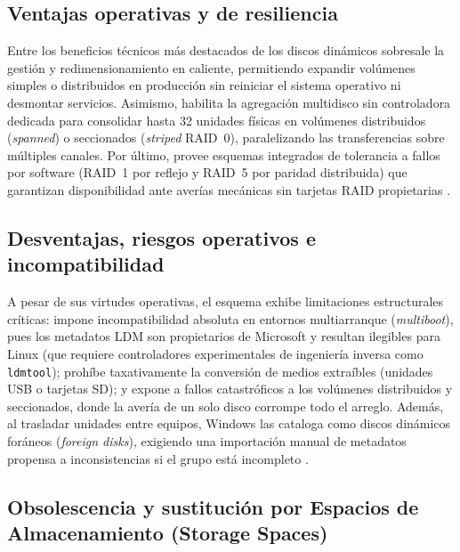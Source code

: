 \documentclass[12pt]{article}
\begin{document}
\subsection{Ventajas operativas y de resiliencia}
\label{subsec:ventajasDinamicos}

Entre los beneficios técnicos más destacados de los discos dinámicos sobresale la gestión y redimensionamiento en caliente, permitiendo expandir volúmenes simples o distribuidos en producción sin reiniciar el sistema operativo ni desmontar servicios. Asimismo, habilita la agregación multidisco sin controladora dedicada para consolidar hasta 32 unidades físicas en volúmenes distribuidos (\textit{spanned}) o seccionados (\textit{striped} RAID~0), paralelizando las transferencias sobre múltiples canales. Por último, provee esquemas integrados de tolerancia a fallos por software (RAID~1 por reflejo y RAID~5 por paridad distribuida) que garantizan disponibilidad ante averías mecánicas sin tarjetas RAID propietarias \parencite[\S 12.7, pp.\ 426--428]{silberschatz2006fundamentos}.

\subsection{Desventajas, riesgos operativos e incompatibilidad}
\label{subsec:desventajasDinamicos}

A pesar de sus virtudes operativas, el esquema exhibe limitaciones estructurales críticas: impone incompatibilidad absoluta en entornos multiarranque (\textit{multiboot}), pues los metadatos LDM son propietarios de Microsoft y resultan ilegibles para Linux (que requiere controladores experimentales de ingeniería inversa como \texttt{ldmtool}); prohíbe taxativamente la conversión de medios extraíbles (unidades USB o tarjetas SD); y expone a fallos catastróficos a los volúmenes distribuidos y seccionados, donde la avería de un solo disco corrompe todo el arreglo. Además, al trasladar unidades entre equipos, Windows las cataloga como discos dinámicos foráneos (\textit{foreign disks}), exigiendo una importación manual de metadatos propensa a inconsistencias si el grupo está incompleto \parencite{microsoft2024basicdynamic}.

\subsection{Obsolescencia y sustitución por Espacios de Almacenamiento (Storage Spaces)}
\label{subsec:obsolescenciaStorageSpaces}
\end{document}
